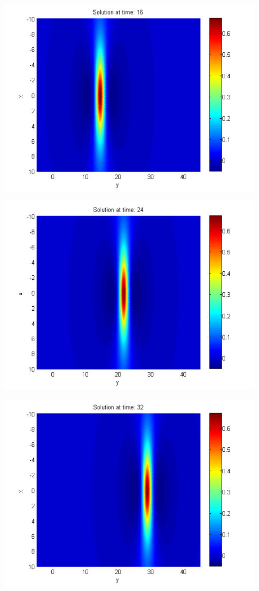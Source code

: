 \documentclass{beamer}
\begin{document}
\begin{frame}
\begin{center}
\begin{minipage}[b]{0.30\linewidth}
		 \includegraphics[width=\linewidth]{../amitans/figures/Solution1_t=16.png}
	\end{minipage}
	\begin{minipage}[b]{0.30\linewidth}
		\includegraphics[width=\linewidth]{../amitans/figures/Solution1_t=24.png}
	\end{minipage}	
	\begin{minipage}[b]{0.30\linewidth}
		 \includegraphics[width=\linewidth]{../amitans/figures/Solution1_t=32.png}

\end{minipage}
\end{center}
\end{frame}
\end{document}
